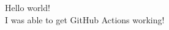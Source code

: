 \documentclass[\finalOption]{article}
\begin{document}

%

Hello world!\\
I was able to get GitHub Actions working!
\end{document}
